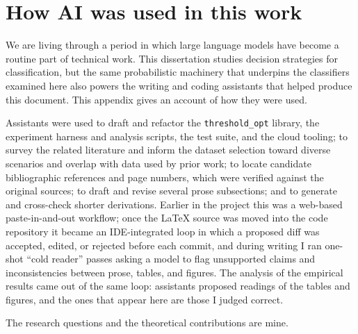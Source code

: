 \chapter{How AI was used in this work}\label{app:ai-disclosure}

We are living through a period in which large language models have become a routine part of technical work. This dissertation studies decision strategies for classification, but the same probabilistic machinery that underpins the classifiers examined here also powers the writing and coding assistants that helped produce this document. This appendix gives an account of how they were used.

Assistants were used to draft and refactor the \texttt{threshold\_opt} library, the experiment harness and analysis scripts, the test suite, and the cloud tooling; to survey the related literature and inform the dataset selection toward diverse scenarios and overlap with data used by prior work; to locate candidate bibliographic references and page numbers, which were verified against the original sources; to draft and revise several prose subsections; and to generate and cross-check shorter derivations. Earlier in the project this was a web-based paste-in-and-out workflow; once the \LaTeX{} source was moved into the code repository it became an IDE-integrated loop in which a proposed diff was accepted, edited, or rejected before each commit, and during writing I ran one-shot ``cold reader'' passes asking a model to flag unsupported claims and inconsistencies between prose, tables, and figures. The analysis of the empirical results came out of the same loop: assistants proposed readings of the tables and figures, and the ones that appear here are those I judged correct.

The research questions and the theoretical contributions are mine.
